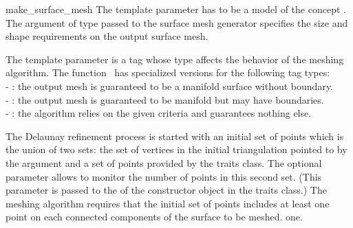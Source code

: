 \begin{ccRefFunction}{make_surface_mesh}
The template parameter  has to be a model
of the concept .
The argument of type   passed to the surface
mesh generator specifies the size and shape  requirements
on the output surface mesh.

The template parameter 
is a tag whose type affects the behavior of the
meshing algorithm. The function \ccRefName\  has specialized versions
for the following  tag types: \\
- : the output mesh is guaranteed to be a manifold
surface without boundary.\\
- : the output mesh is guaranteed to be
manifold but may have boundaries.\\
- : the algorithm relies on the given criteria and
guarantees nothing else.



The Delaunay refinement
process is started with an initial set of points which is the union 
of two sets: the
set of vertices in the initial  triangulation pointed to by the
 argument   and a set of
points provided by the traits class.
The optional parameter  
allows to monitor the number of points in this second set.
(This parameter is passed to the  of 
the constructor object  
in the traits class.)
The meshing algorithm requires that the initial set of points
includes at least one point
on each connected components of the surface to be meshed.
one.


 



\ccSeeAlso
 \\
 \\
 \\
 \\
 \\






\end{ccRefFunction}


